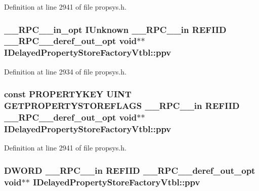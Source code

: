 Definition at line 2941 of file propsys.\+h.

\subsubsection[{\texorpdfstring{ppv}{ppv}}]{ {\bf \+\_\+\+\_\+\+R\+P\+C\+\_\+\+\_\+in\+\_\+opt} I\+Unknown {\bf \+\_\+\+\_\+\+R\+P\+C\+\_\+\+\_\+in} {\bf R\+E\+F\+I\+ID} {\bf \+\_\+\+\_\+\+R\+P\+C\+\_\+\+\_\+deref\+\_\+out\+\_\+opt} {\bf void}$\ast$$\ast$ I\+Delayed\+Property\+Store\+Factory\+Vtbl\+::ppv}\hypertarget{struct_i_delayed_property_store_factory_vtbl_a0cafe89cfd335f33fc32b73b06557d6b}{}\label{struct_i_delayed_property_store_factory_vtbl_a0cafe89cfd335f33fc32b73b06557d6b}


Definition at line 2934 of file propsys.\+h.

\subsubsection[{\texorpdfstring{ppv}{ppv}}]{ {\bf const} {\bf P\+R\+O\+P\+E\+R\+T\+Y\+K\+EY} {\bf U\+I\+NT} {\bf G\+E\+T\+P\+R\+O\+P\+E\+R\+T\+Y\+S\+T\+O\+R\+E\+F\+L\+A\+GS} {\bf \+\_\+\+\_\+\+R\+P\+C\+\_\+\+\_\+in} {\bf R\+E\+F\+I\+ID} {\bf \+\_\+\+\_\+\+R\+P\+C\+\_\+\+\_\+deref\+\_\+out\+\_\+opt} {\bf void}$\ast$$\ast$ I\+Delayed\+Property\+Store\+Factory\+Vtbl\+::ppv}\hypertarget{struct_i_delayed_property_store_factory_vtbl_a937c6ff59d49da4812842bbde3a4761a}{}\label{struct_i_delayed_property_store_factory_vtbl_a937c6ff59d49da4812842bbde3a4761a}


Definition at line 2941 of file propsys.\+h.

\subsubsection[{\texorpdfstring{ppv}{ppv}}]{ {\bf D\+W\+O\+RD} {\bf \+\_\+\+\_\+\+R\+P\+C\+\_\+\+\_\+in} {\bf R\+E\+F\+I\+ID} {\bf \+\_\+\+\_\+\+R\+P\+C\+\_\+\+\_\+deref\+\_\+out\+\_\+opt} {\bf void}$\ast$$\ast$ I\+Delayed\+Property\+Store\+Factory\+Vtbl\+::ppv}\hypertarget{struct_i_delayed_property_store_factory_vtbl_a69f830aa433646a729f826bc1ad63844}{}\label{struct_i_delayed_property_store_factory_vtbl_a69f830aa433646a729f826bc1ad63844}


